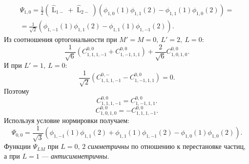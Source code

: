 \documentclass[a4paper]{article}
\begin{document}
\begin{sol}
\begin{enumerate}
\begin{multline*}
\Psi_{1,0}= \frac{1}{2}
\left( \widehat{\operatorname{L}}_{1-}+
\widehat{\operatorname{L}}_{2-}\right) 
\left( \phi_{1,0}(1)\phi_{1,1}(2)
-\phi_{1,1}(1)\phi_{1,0}(2)\right) =\\=
\frac{1}{\sqrt{2} }
\left( \phi_{1,-1}(1)\phi_{1,1}(2)-
\phi_{1,1}(1)\phi_{1,-1}(2)\right) 
.\end{multline*} 
Из соотношения ортогональности
при $M'=M=0,\ L'=2,\ L=0$:
\[
	\frac{1}{\sqrt{6} }\left( 
	C_{1,1,1,-1}^{0,0}+C_{1,-1,1,1}^{0,0}\right) +
	\frac{2}{\sqrt{6} }C_{1,0,1,0}^{0,0}
.\] 
И при $L'=1,\ L=0$:
\[
	\frac{1}{\sqrt{2} }\left( C_{1,1,1,-1}^{0,-}-C_{1,-1,1,1}^{0,0} \right) =0
.\] 
Поэтому
\[
C_{1,1,1,-1}^{0,0}=C_{1,-1,1,1}^{0,0}
.\] 
\[
C_{1,0,1,0}^{0,0}=-C_{1,1,1,-1}^{0,0}
.\] 
Используя условие нормировки получаем:
\[
	\Psi_{0,0}=\frac{1}{\sqrt{3} }\left( 
	\phi_{1,-1}(1)\phi_{1,1}(2)+
\phi_{1,1}(1)\phi_{1,-1}(2)-\phi_{1,0}(1)\phi_{1,0}(2)\right) 
.\] 
Функции $\Psi_{LM}$ при $L=0,\, 2$  \emph{симметричны}
по отношению к перестановке частиц, а при $L=1$ 
--- \emph{антисимметричны}.
\end{enumerate}
\end{sol}
\begin{hiProb}[8]
\end{hiProb}
\end{document}
